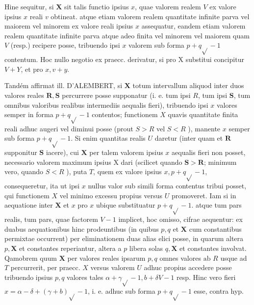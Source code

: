\documentclass[10pt]{article}
\begin{document}
Hine sequitur, si \(\boldsymbol{X}\) sit talis functio ipsius \(x\), quae valorem realem \(V\) ex valore ipsius \(x\) reali \(v\) obtineat. atque etiam valorem realem quantitate infinite parva vel maiorem vel minorem ex valore reali ipsius \(x\) assequatur, eandem etiam valorem realem quantitate infinite parva atque adeo finita vel minorem vel maiorem quam \(V\) (resp.) recipere posse, tribuendo ipsi \(x\) valorem sub forma \(p+q \sqrt{ }-1\) contentum. Hoc nullo negotio ex praecc. derivatur, si pro \(\mathrm{X}\) substitui concipitur \(V+Y\), et pro \(x, v+y\).

Tandém affirmat ill. D'ALEMBERT, si \(\boldsymbol{X}\) totum intervallum aliquod inter duos valores reales \(\boldsymbol{R}, \boldsymbol{S}\) percurrere posse supponatur (i. e. tum ipsi \(R\), tum ipsi \(\boldsymbol{S}\), tum omnibus valoribus realibus intermediis aequalis fieri), tribuendo ipsi \(x\) valores semper in forma \(p+q \sqrt{ }-1\) contentos; functionem \(X\) quavis quantitate finita reali adhuc augeri vel diminui posse (prout \(S>R\) vel \(S<R\) ), manente \(x\) semper sub forma \(p+q \sqrt{ }-1\). Si enim quantitas realis \(U\) daretur (inter quam et \(\boldsymbol{R}\) supponitur \(\boldsymbol{S}\) iacere), cui \(\boldsymbol{X}\) per talem valorem ipsius \(x\) aequalis fieri non posset, necessario valorem maximum ipsius \(\mathrm{X}\) dari (scilicet quando \(\boldsymbol{S}>\boldsymbol{R}\); minimum vero, quando \(S<R\) ), puta \(T\), quem ex valore ipsius \(x, p+q \sqrt{ }-1\), consequeretur, ita ut ipsi \(x\) nullus valor sub simili forma contentus tribui posset, qui functionem \(X\) vel minimo excessu propius versus \(U\) promoveret. Iam si in aequatione inter \(\boldsymbol{X}\) et \(x\) pro \(x\) ubique substituatur \(p+q \sqrt{ }-1\). atque tum pars realis, tum pars, quae factorem \(V-1\) implicet, hoc omisso, cifrae aequentur: ex duabus aequationibus hinc prodeuntibus (in quibus \(p, q\) et \(\boldsymbol{X}\) cum constantibus permixtae occurrent) per eliminationem duas alias elici posse, in quarum altera \(p, \boldsymbol{X}\) et constantes reperiantur, altera a \(p\) libera solas \(q, \boldsymbol{X}\) et constantes involvat. Qamobrem quum \(\mathbf{X}\) per valores reales ipsarum \(p, q\) omnes valores \(\mathrm{ab}\) \(R\) usque ad \(T\) percurrerit, per praecc. \(X\) versus valorem \(U\) adhuc propius accedere posse tribuendo ipsius \(p, q\) valores tales \(\alpha+\gamma \sqrt{ }-1, b+\delta V-1\) resp. Hinc vero fieri \(x=\alpha-\delta+(\gamma+b) \sqrt{ }-1\), i. e. adhuc sub forma \(p+q \sqrt{ }-1\) esse, contra hyp.
\end{document}
